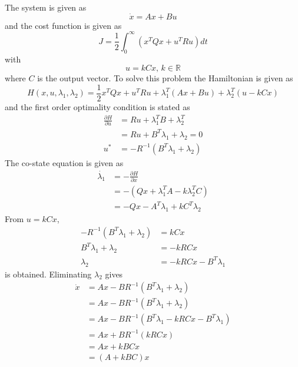 The system is given as
\begin{equation}
    \dot{x}=Ax+Bu
\end{equation}
and the cost function is given as 
\begin{equation}
    J=\frac{1}{2}\int_{0}^{\infty}(x^TQx+u^TRu)dt
\end{equation}
with
\begin{equation}
    u=kCx,\,k\in\mathbb{R}
\end{equation}
where $C$ is the output vector.
To solve this problem the Hamiltonian is given as
\begin{equation}
    H(x,u,\lambda_1,\lambda_2)=\frac{1}{2}x^TQx+u^TRu+\lambda_1^T(Ax+Bu)+\lambda_2^T(u-kCx)
\end{equation}
and the first order optimality condition is stated as 
\begin{equation}
\begin{split}
    \frac{\partial H}{\partial u}&=Ru+\lambda_1^TB+\lambda_2^T\\
    &=Ru+B^T\lambda_1+\lambda_2=0\\
    u^*&=-R^{-1}(B^T\lambda_1+\lambda_2)
\end{split}
\end{equation}
The co-state equation is given as
\begin{equation}
    \begin{split}
        \dot{\lambda_1}&=-\frac{\partial H}{\partial x}\\
        &=-(Qx+\lambda_1^TA-k\lambda_2^TC)\\
        &=-Qx-A^T\lambda_1+kC^T\lambda_2
    \end{split}
\end{equation}
From $u=kCx$,
\begin{equation}
    \begin{split}
        -R^{-1}(B^T\lambda_1+\lambda_2)&=kCx\\
        B^T\lambda_1+\lambda_2&=-kRCx\\
        \lambda_2&=-kRCx-B^T\lambda_1
    \end{split}
\end{equation}
is obtained. Eliminating $\lambda_2$ gives
\begin{equation}
\begin{split}
    \dot{x}&=Ax-BR^{-1}(B^T\lambda_1+\lambda_2)\\
    &=Ax-BR^{-1}(B^T\lambda_1+\lambda_2)\\
    &=Ax-BR^{-1}(B^T\lambda_1-kRCx-B^T\lambda_1)\\
    &=Ax+BR^{-1}(kRCx)\\
    &=Ax+kBCx\\
    &=(A+kBC)x
\end{split}
\end{equation}
